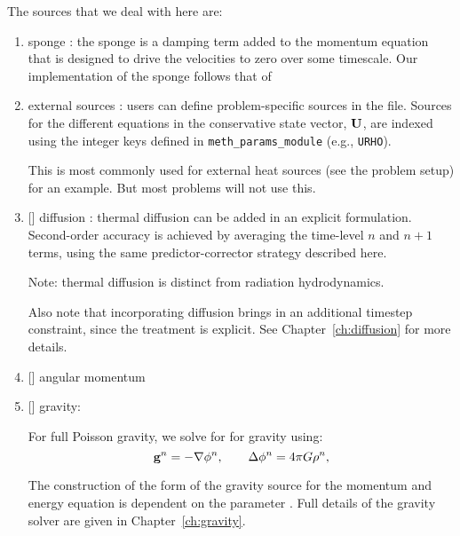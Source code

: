 \begin{enumerate}
The sources that we deal with here are:
\begin{enumerate}
  \item sponge : the sponge is a damping term added to the 
     momentum equation that is designed to drive the velocities to zero
     over some timescale.  Our implementation of the sponge follows that
     of \maestro~\cite{maestro:III}

  \item external sources : users can define problem-specific sources
    in the  file.  Sources for the different
    equations in the conservative state vector, ${\bf U}$, are indexed
    using the integer keys defined in {\tt meth\_params\_module}
    (e.g., {\tt URHO}).

    This is most commonly used for external heat sources (see the
     problem setup) for an example.  But most
    problems will not use this.

  \item {[]} diffusion : thermal diffusion can be
    added in an explicit formulation.  Second-order accuracy is
    achieved by averaging the time-level $n$ and $n+1$ terms, using
    the same predictor-corrector strategy described here.

    Note: thermal diffusion is distinct from radiation hydrodynamics.

    Also note that incorporating diffusion brings in an additional
    timestep constraint, since the treatment is explicit.  See
    Chapter~\ref{ch:diffusion} for more details.  

  \item {[]} angular momentum 


  \item {[]} gravity:

    For full Poisson gravity, we solve for for gravity using:
    \begin{equation}
      {\bf g}^n = -\nabla\phi^n, \qquad
      \Delta\phi^n = 4\pi G\rho^n,
    \end{equation}

    The construction of the form of the gravity source for the
    momentum and energy equation is dependent on the parameter
    .  Full details of the gravity
    solver are given in Chapter~\ref{ch:gravity}.


\end{enumerate}
\end{enumerate}
